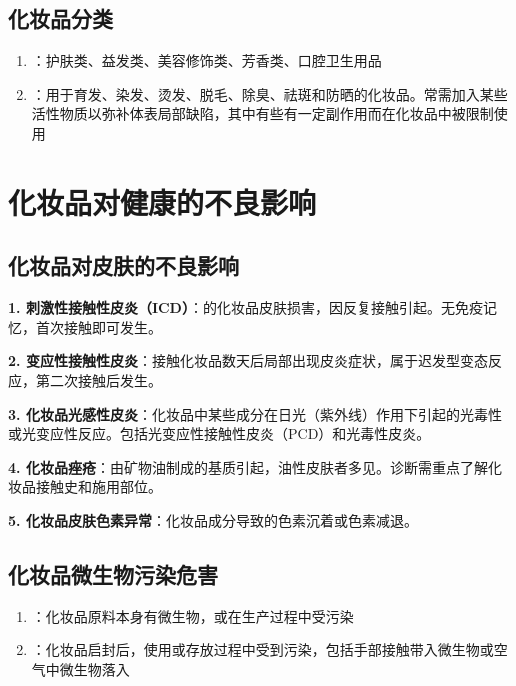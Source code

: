 \documentclass[10pt,a4paper,oneside]{ctexbook}
\begin{document}
\subsection{化妆品分类}

\begin{enumerate}[leftmargin=*]
    \item {}：护肤类、益发类、美容修饰类、芳香类、口腔卫生用品
    \item {}：用于育发、染发、烫发、脱毛、除臭、祛斑和防晒的化妆品。常需加入某些活性物质以弥补体表局部缺陷，其中有些有一定副作用而在化妆品中被限制使用
\end{enumerate}

\section{化妆品对健康的不良影响}

\subsection{化妆品对皮肤的不良影响}

\begin{keybox}
\textbf{1. 刺激性接触性皮炎（ICD）}：的化妆品皮肤损害，因反复接触引起。无免疫记忆，首次接触即可发生。

\textbf{2. 变应性接触性皮炎}：接触化妆品数天后局部出现皮炎症状，属于迟发型变态反应，第二次接触后发生。

\textbf{3. 化妆品光感性皮炎}：化妆品中某些成分在日光（紫外线）作用下引起的光毒性或光变应性反应。包括光变应性接触性皮炎（PCD）和光毒性皮炎。

\textbf{4. 化妆品痤疮}：由矿物油制成的基质引起，油性皮肤者多见。诊断需重点了解化妆品接触史和施用部位。

\textbf{5. 化妆品皮肤色素异常}：化妆品成分导致的色素沉着或色素减退。
\end{keybox}

\subsection{化妆品微生物污染危害}

\begin{enumerate}[leftmargin=*]
    \item {}：化妆品原料本身有微生物，或在生产过程中受污染
    \item {}：化妆品启封后，使用或存放过程中受到污染，包括手部接触带入微生物或空气中微生物落入
\end{enumerate}
\end{document}

